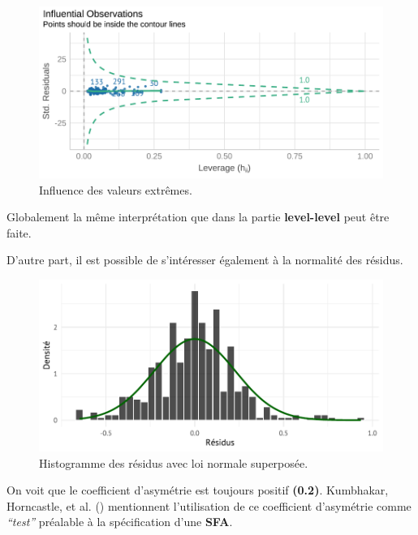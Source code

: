 \documentclass[
  12pt,
]{report}
\begin{document}
\begin{figure}[H]

{\centering \includegraphics{report_files/figure-pdf/outliers_log-1.pdf}

}

\caption{Influence des valeurs extrêmes.}

\end{figure}%

Globalement la même interprétation que dans la partie
\textbf{level-level} peut être faite.

D'autre part, il est possible de s'intéresser également à la normalité
des résidus.

\begin{figure}[H]

{\centering \includegraphics{report_files/figure-pdf/normality_log-1.pdf}

}

\caption{Histogramme des résidus avec loi normale superposée.}

\end{figure}%

On voit que le coefficient d'asymétrie est toujours positif
\textbf{(0.2)}. Kumbhakar, Horncastle, et al.
() mentionnent l'utilisation de ce
coefficient d'asymétrie comme \emph{``test''} préalable à la
spécification d'une \textbf{SFA}.
\end{document}
